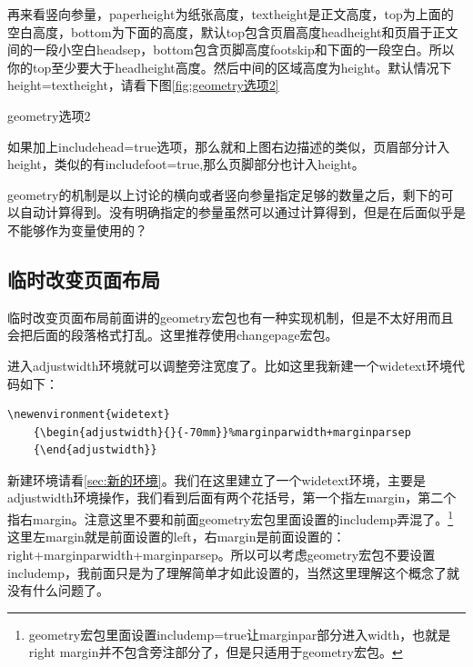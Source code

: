 \documentclass[12pt,oneside]{book}
\begin{document}
\begin{common-format}
再来看竖向参量，paperheight为纸张高度，textheight是正文高度，top为上面的空白高度，bottom为下面的高度，默认top包含页眉高度headheight和页眉于正文间的一段小空白headsep，bottom包含页脚高度footskip和下面的一段空白。所以你的top至少要大于headheight高度。然后中间的区域高度为height。默认情况下height=textheight，请看下图\ref{fig:geometry选项2}

\begin{linefig}{geometry选项2}  
\caption{geometry选项2}
\label{fig:geometry选项2}
\end{linefig}

如果加上includehead=true选项，那么就和上图右边描述的类似，页眉部分计入height，类似的有includefoot=true,那么页脚部分也计入height。

geometry的机制是以上讨论的横向或者竖向参量指定足够的数量之后，剩下的可以自动计算得到。没有明确指定的参量虽然可以通过计算得到，但是在后面似乎是不能够作为变量使用的？


\subsection{临时改变页面布局}
临时改变页面布局前面讲的geometry宏包也有一种实现机制，但是不太好用而且会把后面的段落格式打乱。这里推荐使用changepage宏包。

进入adjustwidth环境就可以调整旁注宽度了。比如这里我新建一个widetext环境代码如下：

\begin{Verbatim}
\newenvironment{widetext}  
	{\begin{adjustwidth}{}{-70mm}}%marginparwidth+marginparsep
	{\end{adjustwidth}}
\end{Verbatim}  

新建环境请看\ref{sec:新的环境}。我们在这里建立了一个widetext环境，主要是adjustwidth环境操作，我们看到后面有两个花括号，第一个指左margin，第二个指右margin。注意这里不要和前面geometry宏包里面设置的includemp弄混了。\footnote{geometry宏包里面设置includemp=true让marginpar部分进入width，也就是right margin并不包含旁注部分了，但是只适用于geometry宏包。}这里左margin就是前面设置的left，右margin是前面设置的：\\right+marginparwidth+marginparsep。所以可以考虑geometry宏包不要设置includemp，我前面只是为了理解简单才如此设置的，当然这里理解这个概念了就没有什么问题了。


\end{common-format}
\end{document}
